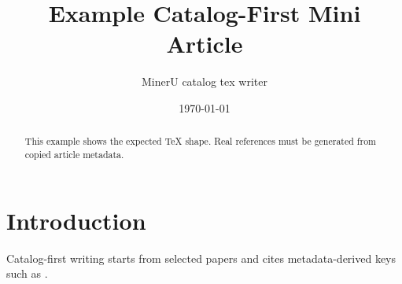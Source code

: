 \documentclass[UTF8]{ctexart}
\title{Example Catalog-First Mini Article}
\author{MinerU catalog tex writer}
\date{\today}
\begin{document}
\maketitle
\begin{abstract}
This example shows the expected TeX shape. Real references must be generated
from copied article metadata.
\end{abstract}
\section{Introduction}
Catalog-first writing starts from selected papers and cites metadata-derived
keys such as \cite{example2024a,example2024b,example2024c}.


\end{document}
